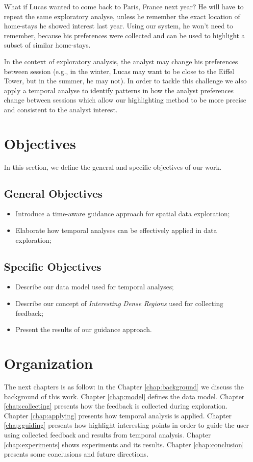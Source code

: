 What if Lucas wanted to come back to Paris, France next year? He will have to repeat the same exploratory analyse, unless he remember the exact location of home-stays he showed interest last year. Using our system, he won't need to remember, because his preferences were collected and can be used to highlight a subset of similar home-stays.

In the context of exploratory analysis, the analyst may change his preferences between session (e.g., in the winter, Lucas may want to be close to the Eiffel Tower, but in the summer, he may not). In order to tackle this challenge we also apply a temporal analyse to identify patterns in how the analyst preferences change between sessions which allow our highlighting method to be more precise and consistent to the analyst interest.

\section{Objectives}

In this section, we define the general and specific objectives of our work.

\subsection{General Objectives}

\begin{itemize}
	\item Introduce a time-aware guidance approach for spatial data exploration;
	\item Elaborate how temporal analyses can be effectively applied in data exploration;
\end{itemize}

\subsection{Specific Objectives}

\begin{itemize}
	\item Describe our data model used for temporal analyses;
	\item Describe our concept of {\em Interesting Dense Regions} used for collecting feedback;
	\item Present the results of our guidance approach.
\end{itemize}

\section{Organization}

The next chapters is as follow: in the Chapter \ref{chap:background} we discuss the background of this work. Chapter \ref{chap:model} defines the data model. Chapter \ref{chap:collecting} presents how the feedback is collected during exploration. Chapter \ref{chap:applying} presents how temporal analysis is applied. Chapter \ref{chap:guiding} presents how highlight interesting points in order to guide the user using collected feedback and results from temporal analysis. Chapter \ref{chap:experiments} shows experiments and its results. Chapter \ref{chap:conclusion} presents some conclusions and future directions.
